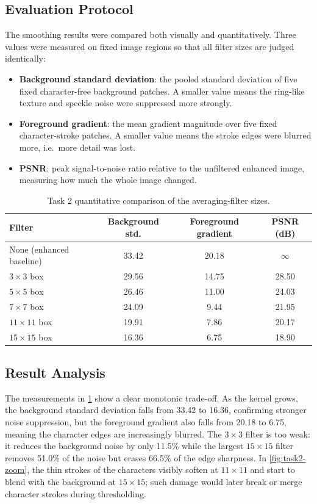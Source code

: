 \subsection{Evaluation Protocol}

The smoothing results were compared both visually and quantitatively.  Three
values were measured on fixed image regions so that all filter sizes are judged
identically:

\begin{itemize}
  \item \textbf{Background standard deviation}: the pooled standard deviation
  of five fixed character-free background patches.  A smaller value means the
  ring-like texture and speckle noise were suppressed more strongly.
  \item \textbf{Foreground gradient}: the mean gradient magnitude over five
  fixed character-stroke patches.  A smaller value means the stroke edges were
  blurred more, i.e.\ more detail was lost.
  \item \textbf{PSNR}: peak signal-to-noise ratio relative to the unfiltered
  enhanced image, measuring how much the whole image changed.
\end{itemize}

\begin{table}[!htbp]
  \centering
  \caption{Task 2 quantitative comparison of the averaging-filter sizes.}
  \label{tab:task2-metrics}
  \begin{tabular}{lccc}
    \toprule
    Filter & Background std. & Foreground gradient & PSNR (dB) \\
    \midrule
    None (enhanced baseline) & 33.42 & 20.18 & $\infty$ \\
    $3\times3$ box & 29.56 & 14.75 & 28.50 \\
    $5\times5$ box & 26.46 & 11.00 & 24.03 \\
    $7\times7$ box & 24.09 & 9.44 & 21.95 \\
    $11\times11$ box & 19.91 & 7.86 & 20.17 \\
    $15\times15$ box & 16.36 & 6.75 & 18.90 \\
    \bottomrule
  \end{tabular}
\end{table}

\subsection{Result Analysis}

The measurements in \cref{tab:task2-metrics} show a clear monotonic trade-off.
As the kernel grows, the background standard deviation falls from 33.42 to
16.36, confirming stronger noise suppression, but the foreground gradient also
falls from 20.18 to 6.75, meaning the character edges are increasingly blurred.
The $3\times3$ filter is too weak: it reduces the background noise by only
11.5\% while the largest $15\times15$ filter removes 51.0\% of the noise but
erases 66.5\% of the edge sharpness.  In \cref{fig:task2-zoom}, the thin
strokes of the characters visibly soften at $11\times11$ and start to blend
with the background at $15\times15$; such damage would later break or merge
character strokes during thresholding.

